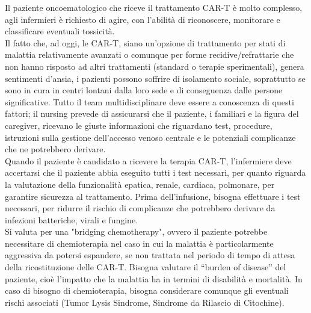 Il paziente oncoematologico che riceve il trattamento CAR-T è molto complesso, agli infermieri è richiesto 
di agire, con l’abilità di riconoscere, monitorare e classificare eventuali tossicità\cite{NURSINGCART}.\\
Il fatto che, ad oggi, le CAR-T, siano un’opzione di trattamento per stati di malattia relativamente avanzati o comunque 
per forme recidive/refrattarie che non hanno risposto ad altri trattamenti (standard o terapie sperimentali), 
genera sentimenti d’ansia, i pazienti possono soffrire di isolamento sociale, soprattutto se sono in cura in centri 
lontani dalla loro sede e di conseguenza dalle persone significative. Tutto il team multidisciplinare deve essere a 
conoscenza di questi fattori; il nursing prevede di assicurarsi che il paziente, i familiari e la figura del caregiver, 
ricevano le giuste informazioni che riguardano test, procedure, istruzioni sulla gestione dell’accesso 
venoso centrale e le potenziali complicanze che ne potrebbero derivare\cite{NURSINGCART}.\\

Quando il paziente è candidato a ricevere la terapia CAR-T, l’infermiere deve accertarsi che il paziente abbia eseguito 
tutti i test necessari, per quanto riguarda la valutazione della funzionalità epatica, 
renale, cardiaca, polmonare, per garantire sicurezza al trattamento\cite{article2}. Prima dell’infusione, 
bisogna effettuare i test necessari, per ridurre il rischio di complicanze che potrebbero derivare 
da infezioni batteriche, virali e fungine\cite{NURSINGCART}.\\
Si valuta per una "bridging chemotherapy", ovvero il paziente potrebbe necessitare di chemioterapia nel caso in cui 
la malattia è particolarmente aggressiva da potersi espandere, se non trattata nel periodo di tempo di attesa della 
ricostituzione delle CAR-T. Bisogna valutare il “burden of disease” del paziente, cioè l’impatto che 
la malattia ha in termini di disabilità e mortalità. 
In caso di bisogno di chemioterapia, bisogna considerare comunque gli eventuali rischi associati 
(Tumor Lysis Sindrome, Sindrome da Rilascio di Citochine)\cite{article3}.\\

